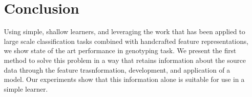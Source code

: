 \documentclass{article}
\begin{document}






\section{Conclusion}

Using simple, shallow learners, and leveraging the work that has been applied to large scale classification tasks combined with handcrafted feature representations, we show state of the art performance in genotyping task.
We present the first method to solve this problem in a way that retains information about the source data through the feature trasnformation, development, and application of a model.
Our experiments show that this information alone is suitable for use in a simple learner.





\small



\end{document}
